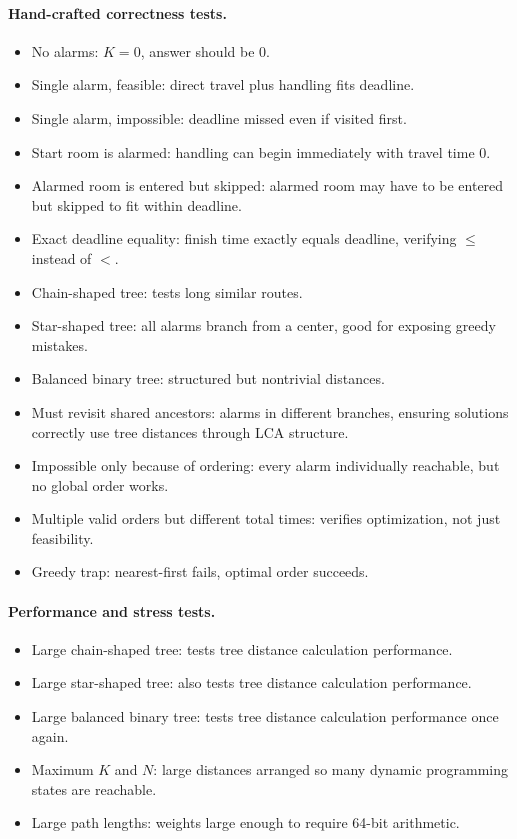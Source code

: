 \documentclass[11pt]{article}
\begin{document}
\paragraph{Hand-crafted correctness tests.}
\begin{itemize}
    \item No alarms: $K=0$, answer should be $0$.
    \item Single alarm, feasible: direct travel plus handling fits deadline.
    \item Single alarm, impossible: deadline missed even if visited first.
    \item Start room is alarmed: handling can begin immediately with travel time $0$.
    \item Alarmed room is entered but skipped: alarmed room may have to be entered but skipped to fit within deadline.
    \item Exact deadline equality: finish time exactly equals deadline, verifying $\le$ instead of $<$.
    \item Chain-shaped tree: tests long similar routes.
    \item Star-shaped tree: all alarms branch from a center, good for exposing greedy mistakes.
    \item Balanced binary tree: structured but nontrivial distances.
    \item Must revisit shared ancestors: alarms in different branches, ensuring solutions correctly use tree distances through LCA structure.
    \item Impossible only because of ordering: every alarm individually reachable, but no global order works.
    \item Multiple valid orders but different total times: verifies optimization, not just feasibility.
    \item Greedy trap: nearest-first fails, optimal order succeeds.
\end{itemize}

\paragraph{Performance and stress tests.}
\begin{itemize}
    \item Large chain-shaped tree: tests tree distance calculation performance.
    \item Large star-shaped tree: also tests tree distance calculation performance.
    \item Large balanced binary tree: tests tree distance calculation performance once again.
    \item Maximum $K$ and $N$: large distances arranged so many dynamic programming states are reachable.
    \item Large path lengths: weights large enough to require 64-bit arithmetic.
\end{itemize}
\end{document}
